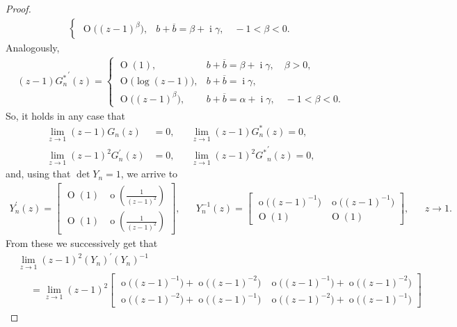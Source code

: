 \documentclass[12pt]{amsart}
\newcommand{\ddi}{\operatorname i}
\begin{document}
\begin{proof}
\begin{align*}
\begin{cases}
\operatorname{O}\big( (z-1)^{\beta} \big) , & b+ \overline{b} = \beta + \ddi \gamma, \quad -1 <\beta < 0 .
\end{cases}
\end{align*}
Analogously,
\begin{align*}
(z-1){G^*_n}^{\prime}(z) =
\begin{cases}
\operatorname{O}(1) , & b+ \overline{b} = \beta + \ddi \gamma, \quad \beta > 0 , \\
\operatorname{O} \big( \log (z-1) \big) , & b+ \overline{b} = \ddi \gamma, \\
\operatorname{O}\big( (z-1)^{\beta} \big) , & b+ \overline{b} = \alpha + \ddi \gamma, \quad -1 <\beta < 0 .
\end{cases}
\end{align*}
So, it holds in any case that
\begin{align*}
\lim_{z\to 1} (z-1) G_n(z) & = 0, && \lim_{z\to 1} (z-1) G^*_n(z) = 0, \\
\lim_{z\to 1} (z-1)^2 G^{\prime}_n(z) & = 0, &&
\lim_{z\to 1} (z-1)^2 {G^*}^{\prime}_n(z) = 0 ,
\end{align*}
and, using that \(\det Y_n = 1 \), we arrive to
\begin{align*}
Y_{n} ^{\prime}(z)
=
\begin{bmatrix}
\operatorname{O}(1) & \operatorname{o}(\frac{1}{(z-1)^2}) \\
\operatorname{O}(1) & \operatorname{o}(\frac{1}{(z-1)^2})
\end{bmatrix}, 
&&
Y_{n}^{-1}(z) 
=
\begin{bmatrix}
\operatorname{o}\big( (z-1)^{-1} \big) & \operatorname{o} \big( (z-1)^{-1} \big) \\
\operatorname{O}(1) & \operatorname{O}(1)
\end{bmatrix}, 
&& z \to 1.
\end{align*}
From these we successively get that
{\small
\begin{align*} 
 & \lim _{z \to 1} (z-1)^{2}\left(Y_{n}\right)^{\prime}\left(Y_{n}\right)^{-1} \\
 & \phantom{ola} =
\lim _{z \to 1} (z-1)^{2}
\begin{bmatrix}
 \operatorname{o} \big( (z-1)^{-1} \big)+ \operatorname{o} \big( (z-1)^{-2} \big) 
 &\operatorname{o} \big( (z-1)^{-1} \big)+\operatorname{o} \big( (z-1)^{-2} \big) \\
 \operatorname{o} \big( (z-1)^{-2} \big) +\operatorname{o} \big( (z-1)^{-1} \big) 
 & \operatorname{o} \big( (z-1)^{-2} \big) + \operatorname{o} \big( (z-1)^{-1} \big)

\end{bmatrix}
\end{align*}}
\end{proof}
\end{document}

